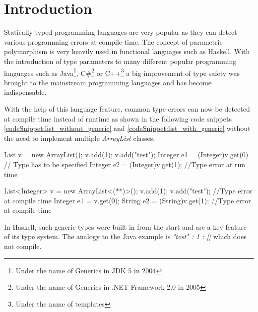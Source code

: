 \section{Introduction}\label{section:introduction}
Statically typed programming languages are very popular as they can detect various programming errors at compile time.
The concept of parametric polymorphism is very heavily used in functional languages such as Haskell. With the introduction of type parameters to many different popular programming languages such as Java\footnote{Under the name of Generics in JDK 5 in 2004\cite{JDK5}},
 C\#\footnote{Under the name of Generics in .NET Framework 2.0 in 2005\cite{dotnet20}} or C++\footnote{Under the name of templates} a big improvement of type safety was brought to the mainstream programming languages and has become indispensable.

With the help of this language feature, common type errors can now be detected at compile time instead of runtime as shown in the following code snippets \ref{codeSnippet:list_without_generic} and \ref{codeSnippet:list_with_generic} without the need to implement multiple \emph{ArrayList} classes.

\begin{adjustbox}{width=\columnwidth}
\begin{codesnippet}[caption={List without generic argument in Java}, label={codeSnippet:list_without_generic}]
List v = new ArrayList();
v.add(1);
v.add("test");
Integer e1 = (Integer)v.get(0) // Type has to be specified
Integer e2 = (Integer)v.get(1); //Type error at run time
\end{codesnippet}
\end{adjustbox}
\begin{adjustbox}{width=\columnwidth}
\begin{codesnippet}[escapeinside={(*}{*)}, caption={List with type argument in Java}, label={codeSnippet:list_with_generic}]
List<Integer> v = new ArrayList<(**)>();
v.add(1);
v.add("test"); //Type error at compile time
Integer e1 = v.get(0);
String e2 = (String)v.get(1); //Type error at compile time
\end{codesnippet}
\end{adjustbox}
\linebreak

In Haskell, such generic types were built in from the start and are a key feature of its type system. The analogy to the Java example is \emph{"test" : 1 : []} which does not compile.

